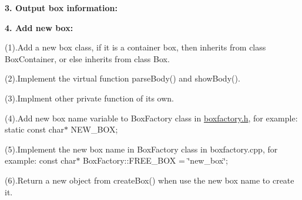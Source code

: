  {\bfseries{3. Output box information\+:}} 
\begin{DoxyCode}{0}
\DoxyCodeLine{\{}
\DoxyCodeLine{    }
\DoxyCodeLine{    }
\DoxyCodeLine{    }
\DoxyCodeLine{}
\DoxyCodeLine{    }
\DoxyCodeLine{\}}
\end{DoxyCode}
 {\bfseries{4. Add new box\+:}}

(1).Add a new box class, if it is a container box, then inherits from class Box\+Container, or else inherits from class Box.

(2).Implement the virtual function parse\+Body() and show\+Body().

(3).Implment other private function of its own.

(4).Add new box name variable to Box\+Factory class in \mbox{\hyperlink{boxfactory_8h_source}{boxfactory.\+h}}, for example\+: static const char$\ast$ N\+E\+W\+\_\+\+B\+OX;

(5).Implement the new box name in Box\+Factory class in boxfactory.\+cpp, for example\+: const char$\ast$ Box\+Factory\+::\+F\+R\+E\+E\+\_\+\+B\+OX = \char`\"{}new\+\_\+box\char`\"{};

(6).Return a new object from create\+Box() when use the new box name to create it. 